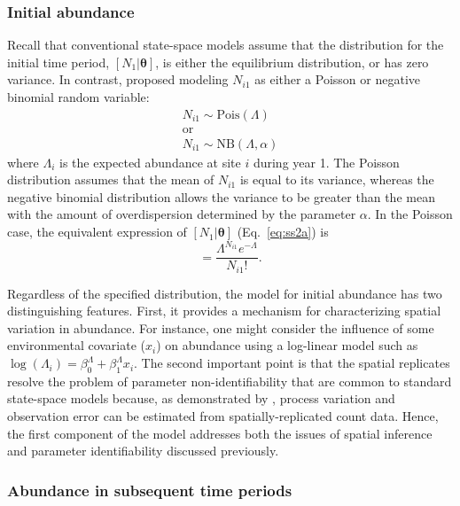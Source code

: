 \documentclass[12pt]{article}
\begin{document}
\subsubsection{Initial abundance}

Recall that conventional state-space models assume that the
distribution for the initial time period,
$[N_1 | \bm{\theta}]$, is either the equilibrium
distribution, or has zero variance.
In contrast, \citet{dail_madsen:2011} proposed modeling $N_{i1}$
as either a Poisson or negative binomial random variable:
\begin{gather}
N_{i1} \sim \mathrm{Pois}(\Lambda) \nonumber \\
\text{or} \nonumber \\
N_{i1} \sim \mathrm{NB}(\Lambda, \alpha)
\label{eq:N1}
\end{gather}
where $\Lambda_i$ is the expected abundance at site $i$ during
year 1.
The Poisson distribution assumes that the mean of $N_{i1}$ is
equal to its variance, whereas the negative binomial distribution allows the
variance to be greater than the mean with the amount of
overdispersion determined by the parameter $\alpha$.
In the Poisson case, the equivalent expression of
$[N_1 | \bm{\theta}]$ (Eq.~\ref{eq:ss2a}) is
\begin{equation}
[N_{i1} | \Lambda] =
\frac{\Lambda^{N_{i1}}e^{-\Lambda}}{N_{i1}!}.
  \label{eq:N1br}
\end{equation}

Regardless of the specified distribution, the model for initial
abundance has two distinguishing features. First, it provides a
mechanism for characterizing spatial variation in abundance. For
instance, one might consider the influence of some environmental
covariate ($x_i$) on abundance using a log-linear
model such as $\log(\Lambda_i) = \beta^{\Lambda}_0 +
\beta^{\Lambda}_1
x_{i}$. The second important point is that the spatial
replicates resolve the
problem of parameter non-identifiability that are common to
standard state-space models because, as demonstrated by
\citet{royle:2004biom},
process variation and observation error can be estimated from
spatially-replicated count data. Hence, the first component of
the model addresses both the issues of spatial inference and
parameter identifiability discussed previously.

\subsubsection{Abundance in subsequent time periods}
\end{document}
